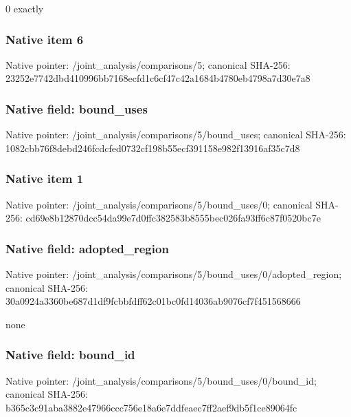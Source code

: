 \documentclass[10pt,a4paper]{article}
\begin{document}
0 exactly


\subsubsection{Native item 6}


Native pointer: /joint\_analysis/comparisons/5; canonical SHA-256: 23252e7742dbd410996bb716\allowbreak{}8ecfd1c6cf47c42a1684b478\allowbreak{}0eb4798a7d30e7a8



\subsubsection{Native field: bound\_uses}


Native pointer: /joint\_analysis/comparis\allowbreak{}ons/5/bound\_uses; canonical SHA-256: 1082cbb76f8debd246fcdcfe\allowbreak{}d0732cf198b55ecf391158e9\allowbreak{}82f13916af35c7d8



\subsubsection{Native item 1}


Native pointer: /joint\_analysis/comparis\allowbreak{}ons/5/bound\_uses/0; canonical SHA-256: cd69e8b12870dcc54da99e7d\allowbreak{}0ffc382583b8555bec026fa9\allowbreak{}3ff6c87f0520bc7e



\subsubsection{Native field: adopted\_region}


Native pointer: /joint\_analysis/comparis\allowbreak{}ons/5/bound\_uses/0/adopt\allowbreak{}ed\_region; canonical SHA-256: 30a0924a3360be687d1df9fc\allowbreak{}bbfdff62c01bc0fd14036ab9\allowbreak{}076cf7f451568666


none


\subsubsection{Native field: bound\_id}


Native pointer: /joint\_analysis/comparis\allowbreak{}ons/5/bound\_uses/0/bound\allowbreak{}\_id; canonical SHA-256: b365c3c91aba3882e47966cc\allowbreak{}c756e18a6e7ddfeaec7ff2ae\allowbreak{}f9db5f1ce89064fc
\end{document}
